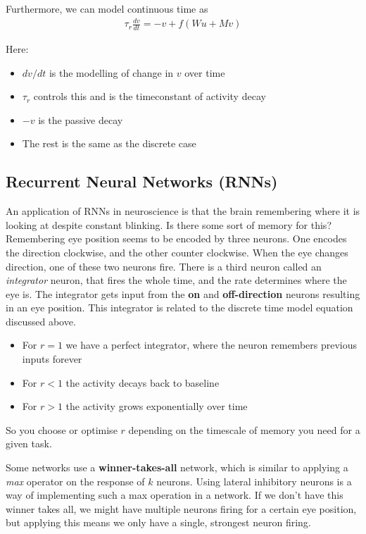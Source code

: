 \documentclass[11pt,a4paper,titlepage,dvipsnames,cmyk]{scrartcl}
\begin{document}
Furthermore, we can model continuous time as
\begin{align*}
\tau_r \frac{dv}{dt} = -v + f(Wu + Mv)
\end{align*}

Here:
\begin{itemize}
    \item $dv/dt$ is the modelling of change in $v$ over time
    \item $\tau_r$ controls this and is the timeconstant of activity decay
    \item $-v$ is the passive decay
    \item The rest is the same as the discrete case
\end{itemize}

\subsection{Recurrent Neural Networks (RNNs)}
An application of RNNs in neuroscience is that the brain remembering where it is looking at despite constant blinking. Is there some sort of memory for this? Remembering eye position seems to be encoded by three neurons. One encodes the direction clockwise, and the other counter clockwise. When the eye changes direction, one of these two neurons fire. There is a third neuron called an \textit{integrator} neuron, that fires the whole time, and the rate determines where the eye is. The integrator gets input from the \textbf{on} and \textbf{off-direction} neurons resulting in an eye position. This integrator is related to the discrete time model equation discussed above.

\begin{itemize}
    \item For $r=1$ we have a perfect integrator, where the neuron remembers previous inputs forever
    \item For $r<1$ the activity decays back to baseline
    \item For $r>1$ the activity grows exponentially over time
\end{itemize}

So you choose or optimise $r$ depending on the timescale of memory you need for a given task.

Some networks use a \textbf{winner-takes-all} network, which is similar to applying a \textit{max} operator on the response of $k$ neurons. Using lateral inhibitory neurons is a way of implementing such a max operation in a network. If we don't have this winner takes all, we might have multiple neurons firing for a certain eye position, but applying this means we only have a single, strongest neuron firing.
\end{document}
